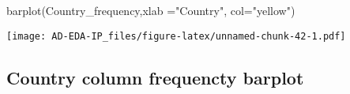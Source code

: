 \documentclass[
]{article}
\newenvironment{Shaded}{\begin{snugshade}}{\end{snugshade}}
\newcommand{\AttributeTok}[1]{\textcolor[rgb]{0.77,0.63,0.00}{#1}}
\newcommand{\FunctionTok}[1]{\textcolor[rgb]{0.00,0.00,0.00}{#1}}
\newcommand{\NormalTok}[1]{#1}
\newcommand{\OtherTok}[1]{\textcolor[rgb]{0.56,0.35,0.01}{#1}}
\newcommand{\SpecialCharTok}[1]{\textcolor[rgb]{0.00,0.00,0.00}{#1}}
\newcommand{\StringTok}[1]{\textcolor[rgb]{0.31,0.60,0.02}{#1}}
\begin{document}
\begin{Shaded}
\begin{Highlighting}[]
\FunctionTok{barplot}\NormalTok{(Country\_frequency,}\AttributeTok{xlab =}\StringTok{"Country"}\NormalTok{, }\AttributeTok{col=}\StringTok{"yellow"}\NormalTok{)}
\end{Highlighting}
\end{Shaded}

\texttt{[image: AD-EDA-IP\_files/figure-latex/unnamed-chunk-42-1.pdf]}

\hypertarget{country-column-frequencty-barplot-1}{%
\subsection{Country column frequencty
barplot}\label{country-column-frequencty-barplot-1}}

\begin{Shaded}
\end{Shaded}
\end{document}
